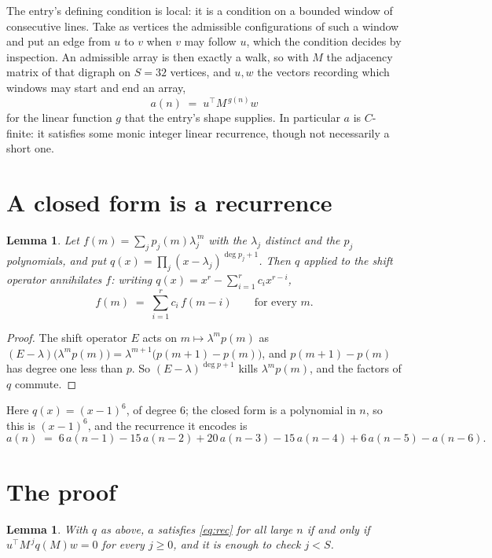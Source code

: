 \documentclass[11pt,a4paper]{article}
\theoremstyle{plain}
\newtheorem{lemma}[theorem]{Lemma}
\theoremstyle{definition}
\begin{document}
The entry's defining condition is local: it is a condition on a bounded window of consecutive lines. Take as vertices the
admissible configurations of such a window and put an edge from $u$ to $v$ when $v$ may
follow $u$, which the condition decides by inspection. An admissible array is then exactly a
walk, so with $M$ the adjacency matrix of that digraph on $S=32$ vertices, and $u,w$ the
vectors recording which windows may start and end an array,
\[
a(n)\;=\;u^{\!\top}M^{\,g(n)}w
\]
for the linear function $g$ that the entry's shape supplies. In particular $a$ is
$C$-finite: it satisfies some monic integer linear recurrence, though not necessarily a short
one.

\section{A closed form is a recurrence}

\begin{lemma}\label{lem:ann}
Let $f(m)=\sum_{j}p_j(m)\lambda_j^{\,m}$ with the $\lambda_j$ distinct and the $p_j$
polynomials, and put $q(x)=\prod_j(x-\lambda_j)^{\deg p_j+1}$. Then $q$ applied to the shift
operator annihilates $f$: writing $q(x)=x^{r}-\sum_{i=1}^{r}c_ix^{r-i}$,
\[
f(m)\;=\;\sum_{i=1}^{r}c_i\,f(m-i)\qquad\text{for every }m.
\]
\end{lemma}

\begin{proof}
The shift operator $E$ acts on $m\mapsto\lambda^{m}p(m)$ as
$(E-\lambda)\bigl(\lambda^{m}p(m)\bigr)=\lambda^{m+1}\bigl(p(m+1)-p(m)\bigr)$, and
$p(m+1)-p(m)$ has degree one less than $p$. So $(E-\lambda)^{\deg p+1}$ kills
$\lambda^{m}p(m)$, and the factors of $q$ commute.
\end{proof}

Here $q(x)=(x-1)^{6}$, of degree $6$; the closed form is a polynomial in $n$, so this is $(x-1)^{6}$, and the recurrence it encodes is
\begin{equation}\label{eq:rec}
a(n)\;=\;6\,a(n-1) - 15\,a(n-2) + 20\,a(n-3) - 15\,a(n-4) + 6\,a(n-5) - a(n-6).
\end{equation}

\section{The proof}

\begin{lemma}\label{lem:crit}
With $q$ as above, $a$ satisfies \eqref{eq:rec} for all large $n$ if and only if
$u^{\!\top}M^{\,j}q(M)w=0$ for every $j\ge0$, and it is enough to check $j<S$.
\end{lemma}
\end{document}
